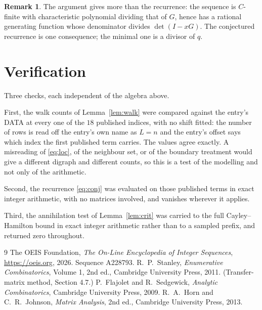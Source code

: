 \documentclass[11pt,a4paper]{article}
\theoremstyle{plain}
\theoremstyle{definition}
\newtheorem{remark}[theorem]{Remark}
\begin{document}
\begin{remark}
The argument gives more than the recurrence: the sequence is $C$-finite with characteristic
polynomial dividing that of $G$, hence has a rational generating function whose denominator
divides $\det(I-xG)$. The conjectured recurrence is one consequence; the minimal one is a
divisor of $q$.
\end{remark}

\section{Verification}

Three checks, each independent of the algebra above.

First, the walk counts of Lemma~\ref{lem:walk} were compared against the entry's DATA at
every one of the $18$ published indices, with no shift fitted: the number of rows is
read off the entry's own name as $L=n$ and the entry's offset says which index the first
published term carries. The values agree exactly. A misreading of \eqref{eq:loc}, of the
neighbour set, or of the boundary treatment would give a different digraph and different
counts, so this is a test of the modelling and not only of the arithmetic.

Second, the recurrence \eqref{eq:conj} was evaluated on those published terms in exact
integer arithmetic, with no matrices involved, and vanishes wherever it applies.

Third, the annihilation test of Lemma~\ref{lem:crit} was carried to the full
Cayley--Hamilton bound in exact integer arithmetic rather than to a sampled prefix, and
returned zero throughout.

\begin{thebibliography}{9}
 The OEIS Foundation, \emph{The On-Line Encyclopedia of Integer
Sequences}, \url{https://oeis.org}, 2026. Sequence A228793.
 R.~P.~Stanley, \emph{Enumerative Combinatorics}, Volume 1, 2nd ed.,
Cambridge University Press, 2011. (Transfer-matrix method, Section 4.7.)
 P.~Flajolet and R.~Sedgewick, \emph{Analytic Combinatorics}, Cambridge
University Press, 2009.
 R.~A.~Horn and C.~R.~Johnson, \emph{Matrix Analysis}, 2nd ed., Cambridge
University Press, 2013.
\end{thebibliography}
\end{document}
